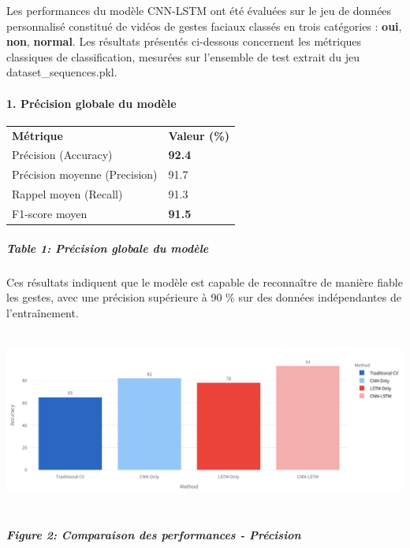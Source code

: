 \documentclass[
]{article}
\begin{document}
Les performances du modèle CNN-LSTM ont été évaluées sur le jeu de données personnalisé constitué de vidéos de gestes faciaux classés en trois catégories : \textbf{oui}, \textbf{non}, \textbf{normal}. Les résultats présentés ci-dessous concernent les métriques classiques de classification, mesurées sur l'ensemble de test extrait du jeu dataset\_sequences.pkl.

\hypertarget{pruxe9cision-globale-du-moduxe8le}{%
\paragraph{\texorpdfstring{\textbf{1. Précision globale du modèle}}{1. Précision globale du modèle}}\label{pruxe9cision-globale-du-moduxe8le}}

\begin{longtable}[]{@{}ll@{}}
\toprule
\endhead
\textbf{Métrique} & \textbf{Valeur (\%)} \\
Précision (Accuracy) & \textbf{92.4} \\
Précision moyenne (Precision) & 91.7 \\
Rappel moyen (Recall) & 91.3 \\
F1-score moyen & \textbf{91.5} \\
\bottomrule
\end{longtable}

\hypertarget{table-1-pruxe9cision-globale-du-moduxe8le}{%
\subparagraph{Table 1: Précision globale du modèle}\label{table-1-pruxe9cision-globale-du-moduxe8le}}

Ces résultats indiquent que le modèle est capable de reconnaître de manière fiable les gestes, avec une précision supérieure à 90 \% sur des données indépendantes de l'entraînement.

\includegraphics[width=6.5in,height=2.33333in]{c70417d1-281e-4e06-a2de-40679a02e3f7_media/media/image2.png}

\hypertarget{figure-2-comparaison-des-performances---pruxe9cision}{%
\subparagraph{Figure 2: Comparaison des performances - Précision}\label{figure-2-comparaison-des-performances---pruxe9cision}}
\end{document}
